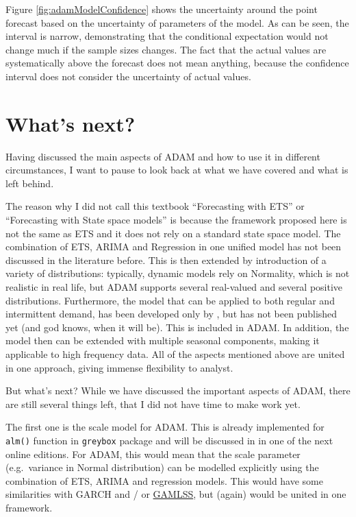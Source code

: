 \documentclass[
]{book}
\theoremstyle{definition}
\theoremstyle{definition}
\theoremstyle{definition}
\theoremstyle{definition}
\theoremstyle{remark}
\begin{document}
Figure \ref{fig:adamModelConfidence} shows the uncertainty around the point forecast based on the uncertainty of parameters of the model. As can be seen, the interval is narrow, demonstrating that the conditional expectation would not change much if the sample sizes changes. The fact that the actual values are systematically above the forecast does not mean anything, because the confidence interval does not consider the uncertainty of actual values.

\hypertarget{conclusions}{%
\chapter{What's next?}\label{conclusions}}

Having discussed the main aspects of ADAM and how to use it in different circumstances, I want to pause to look back at what we have covered and what is left behind.

The reason why I did not call this textbook ``Forecasting with ETS'' or ``Forecasting with State space models'' is because the framework proposed here is not the same as ETS and it does not rely on a standard state space model. The combination of ETS, ARIMA and Regression in one unified model has not been discussed in the literature before. This is then extended by introduction of a variety of distributions: typically, dynamic models rely on Normality, which is not realistic in real life, but ADAM supports several real-valued and several positive distributions. Furthermore, the model that can be applied to both regular and intermittent demand, has been developed only by \citet{Svetunkov2019a}, but has not been published yet (and god knows, when it will be). This is included in ADAM. In addition, the model then can be extended with multiple seasonal components, making it applicable to high frequency data. All of the aspects mentioned above are united in one approach, giving immense flexibility to analyst.

But what's next? While we have discussed the important aspects of ADAM, there are still several things left, that I did not have time to make work yet.

The first one is the scale model for ADAM. This is already implemented for \texttt{alm()} function in \texttt{greybox} package and will be discussed in \citet{SvetunkovSBA} in one of the next online editions. For ADAM, this would mean that the scale parameter (e.g.~variance in Normal distribution) can be modelled explicitly using the combination of ETS, ARIMA and regression models. This would have some similarities with GARCH and / or \href{https://www.gamlss.com/}{GAMLSS}, but (again) would be united in one framework.
\end{document}
